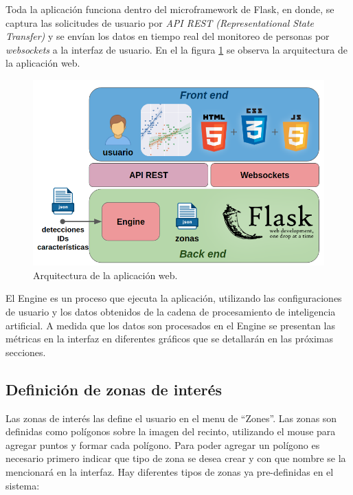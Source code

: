 Toda la aplicación funciona dentro del microframework de Flask, en donde, se captura las solicitudes de usuario por \textit{API REST (Representational 
State Transfer)} \citep{API_REST} y se envían los datos en tiempo real del monitoreo de personas por \textit{websockets} \citep{WEBSOCKETS} a la interfaz de usuario. En el la figura \ref{fig:arquitecturaWebApp} se observa la arquitectura de la aplicación web.

\begin{figure}[ht]
	\centering
	\includegraphics[scale=.6]{./Figures/arquitecturaWebApp.png}
	\caption{Arquitectura de la aplicación web.}
	\label{fig:arquitecturaWebApp}
\end{figure}

El Engine es un proceso que ejecuta la aplicación, utilizando las configuraciones de usuario y los datos obtenidos de la cadena de procesamiento de inteligencia artificial. A medida que los datos son procesados en el Engine se presentan las métricas en la interfaz en diferentes gráficos que se detallarán en las próximas secciones.

\newpage

\subsection{Definición de zonas de interés}

Las zonas de interés las define el usuario en el menu de ``Zones''. Las zonas son definidas como polígonos sobre la imagen del recinto, utilizando el mouse para agregar puntos y formar cada polígono. Para poder agregar un polígono es necesario primero indicar que tipo de zona se desea crear y con que nombre se la mencionará en la interfaz. Hay diferentes tipos de zonas ya pre-definidas en el sistema:

